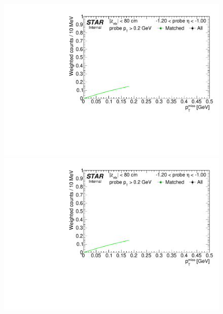 \begin{figure}[ht]\ContinuedFloat
\centering
\parbox{0.24\textwidth}{ 
  \centering
  \includegraphics[width=\linewidth,page=5]{graphics/correctionsToEff/TOF_tagAndProbe/Fitting_effVsEta_data.CPT2.pdf}\\
  \includegraphics[width=\linewidth,page=7]{graphics/correctionsToEff/TOF_tagAndProbe/Fitting_effVsEta_data.CPT2.pdf}\\
}
\end{figure}
